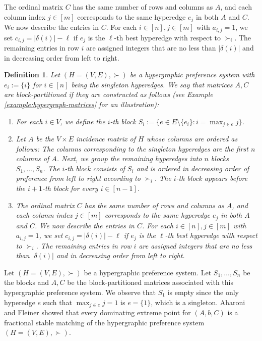 \documentclass[11pt]{article}
\newtheorem{definition}[theorem]{Definition}
\begin{document}
The ordinal matrix $C$ has the same number of rows and columns as $A$, and each column index $j\in [m]$ corresponds to the same hyperedge $e_j$ in both $A$ and $C$. We now describe the entries in $C$. For each $i\in[n],j\in[m]$ with $a_{i,j}=1$, we set $c_{i,j}=|\delta(i)|-\ell$ if $e_j$ is the $\ell$-th best hyperedge with respect to $\succ_i$. The remaining entries in row $i$ are assigned integers that are no less than $|\delta(i)|$ and in decreasing order from left to right. 
\fi

\begin{definition}\label{def:block}
    Let $(H=(V,E),\succ)$ be a hypergraphic preference system with $e_i:=\{i\}$ for $i\in [n]$ being the singleton hyperedges. We say that matrices $A,C$ are \emph{block-partitioned} if they are constructed as follows (see Example \ref{example:hypergraph-matrices} for an illustration): 
    \begin{enumerate}
        \item For each $i\in V$, we define the $i$-th block $S_i:=\{e\in E\setminus\{e_i\}:i=\max_{j\in e} j\}$. 
        
        \item Let $A$ be the $V\times E$ incidence matrix of $H$ whose columns are ordered as follows: The columns corresponding to the singleton hyperedges are the first $n$ columns of $A$. Next, we group the remaining hyperedges into $n$ blocks $S_1, \ldots, S_n$. The $i$-th block consists of $S_i$ and is ordered in decreasing order of preference from left to right according to $\succ_{i}$. The $i$-th block appears before the $i+1$-th block for every $i\in [n-1]$. 
        
        \item The ordinal matrix $C$ has the same number of rows and columns as $A$, and each column index $j\in [m]$ corresponds to the same hyperedge $e_j$ in both $A$ and $C$. We now describe the entries in $C$. For each $i\in[n],j\in[m]$ with $a_{i,j}=1$, we set $c_{i,j}=|\delta(i)|-\ell$ if $e_j$ is the $\ell$-th best hyperedge with respect to $\succ_i$. The remaining entries in row $i$ are assigned integers that are no less than $|\delta(i)|$ and in decreasing order from left to right. 
    \end{enumerate}
\end{definition}
Let $(H=(V,E),\succ)$ be a hypergraphic preference system. Let $S_1, \ldots, S_n$ be the blocks and $A, C$ be the block-partitioned matrices associated with this hypergraphic preference system. We observe that $S_1$ is empty since the only hyperedge $e$ such that $\max_{j\in e} j=1$ is $e=\{1\}$, which is a singleton. Aharoni and Fleiner \cite{aharoni2003lemma} showed that every dominating extreme point for $(A,b,C)$ is a fractional stable matching of the hypergraphic preference system $(H=(V,E),\succ)$. 
\end{document}
